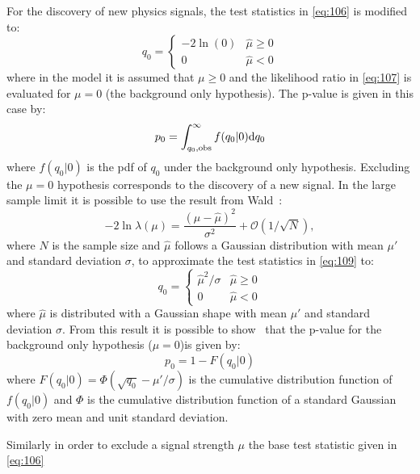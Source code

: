 For the discovery of new physics signals, the test statistics in \cref{eq:106} is
modified to:
\begin{equation}
  \label{eq:108}
  q_0 =
  \left\{
    \begin{array}{lr}
      - 2 \ln(0)  & \hat{\mu} \geq 0 \\
      0 & \hat{\mu} < 0
    \end{array}
    \right.
\end{equation}
where in the model it is assumed that $\mu \geq 0$ and the likelihood ratio in
\cref{eq:107} is evaluated for $\mu = 0$ (the background only hypothesis). The
p-value is given in this case by:
\begin{equation}
  \label{eq:109}
  p_0 = \int_{q_0, \mathrm{obs}}^\infty f(q_0 | 0) \mathrm{d} q_0
\end{equation}
where $f(q_0 | 0)$ is the \gls{pdf} of $q_0$ under the background only
hypothesis. Excluding the $\mu = 0$ hypothesis corresponds to the discovery of a
new signal. In the large sample limit it is possible to use the result from
Wald~\cite{WaldApproximation}:
\begin{equation}
  \label{eq:110}
  - 2 \ln \lambda(\mu) = \frac{(\mu - \hat{\mu})^2}{\sigma^2} + \mathcal{O}(1/\sqrt{N}),
\end{equation}
where $N$ is the sample size and $\hat{\mu}$ follows a Gaussian distribution
with mean $\mu'$ and standard deviation $\sigma$, to approximate the test
statistics in \cref{eq:109} to:
\begin{equation}
  \label{eq:111}
  q_0 = \left\{
    \begin{array}{lr}
      \hat{\mu}^2/\sigma & \hat{\mu} \geq 0 \\
      0 & \hat{\mu} < 0
    \end{array}
    \right.
\end{equation}
where $\hat{\mu}$ is distributed with a Gaussian shape with mean $\mu'$ and
standard deviation $\sigma$. From this result it is possible to
show~\cite{StatProcedure} that the p-value for the background only hypothesis
($\mu = 0$)is given by:
\begin{equation}
  \label{eq:112}
  p_0 = 1 - F(q_0|0)
\end{equation}
where $F(q_0|0) = \Phi \left( \sqrt{q_0} - \mu' / \sigma \right)$ is the
cumulative distribution function of $f(q_0|0)$ and $\Phi$ is the cumulative
distribution function of a standard Gaussian with zero mean and unit standard
deviation.

Similarly in order to exclude a signal strength $\mu$ the base test statistic
given in \cref{eq:106}
